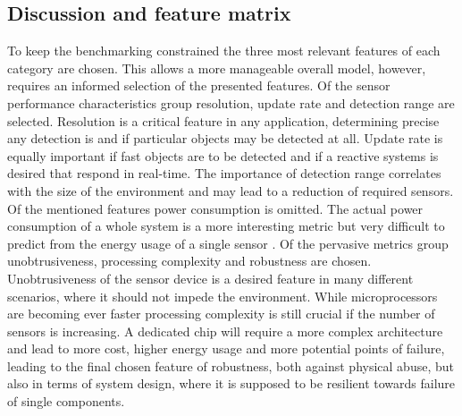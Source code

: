 \subsection{Discussion and feature matrix}
To keep the benchmarking constrained the three most relevant features of each category are chosen. This allows a more manageable overall model, however, requires an informed  selection of the presented features. Of the sensor performance characteristics group resolution, update rate and detection range are selected. Resolution is a critical feature in any application, determining precise any detection is and if particular objects may be detected at all. Update rate is equally important if fast objects are to be detected and if a reactive systems is desired that respond in real-time. The importance of detection range correlates with the size of the environment and may lead to a reduction of required sensors. Of the mentioned features  power consumption is omitted. The actual power consumption of a whole system is a more interesting metric but very difficult to predict from the energy usage of a single sensor \cite{landsiedel2005accurate}. Of the pervasive metrics group unobtrusiveness, processing complexity and robustness are chosen. Unobtrusiveness of the sensor device is a desired feature in many different scenarios, where it should not impede the environment. While microprocessors are becoming ever faster processing complexity is still crucial if the number of sensors is increasing. A dedicated chip will require a more complex architecture and lead to more cost, higher energy usage and more potential points of failure, leading to the final chosen feature of robustness, both against physical abuse, but also in terms of system design, where it is supposed to be resilient towards failure of single components. 
